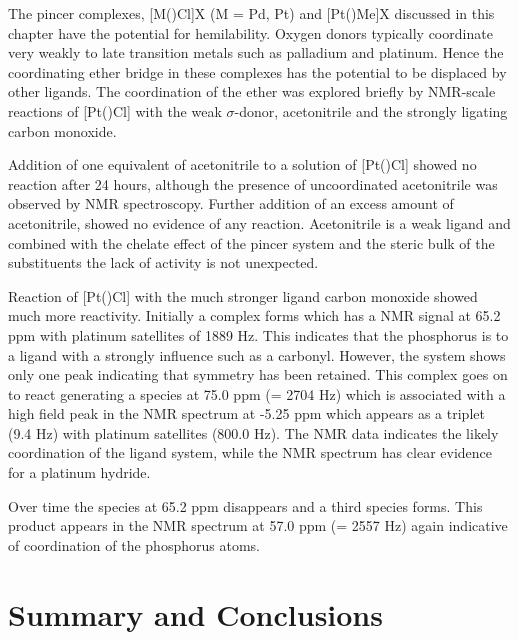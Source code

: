 The pincer complexes, [M(\tBuxantphos)Cl]X (M = Pd, Pt) and [Pt(\tBuxantphos)Me]X discussed in this chapter have the potential for hemilability.  Oxygen donors typically coordinate very weakly to late transition metals such as palladium and platinum.  Hence the coordinating ether bridge in these complexes has the potential to be displaced by other ligands.  The coordination of the ether was explored briefly by NMR-scale reactions of [Pt(\tButhixantphos)Cl] with the weak $\sigma$-donor, acetonitrile and the strongly ligating carbon monoxide.  

Addition of one equivalent of acetonitrile to a  solution of [Pt(\tButhixantphos)Cl] showed no reaction after 24 hours, although the presence of uncoordinated acetonitrile was observed by \proton{} NMR spectroscopy.  Further addition of an excess amount of acetonitrile, showed no evidence of any reaction.  Acetonitrile is a weak ligand and combined with the chelate effect of the pincer system and the steric bulk of the \tBu{} substituents the lack of activity is not unexpected.  

Reaction of [Pt(\tButhixantphos)Cl] with the much stronger ligand carbon monoxide showed much more reactivity.  Initially a complex forms which has a \phosphorus{} NMR signal at 65.2 ppm with platinum satellites of 1889 Hz.  This indicates that the phosphorus is \trans{} to a ligand with a strongly \trans{} influence such as a carbonyl.  However, the system shows only one \phosphorus{} peak indicating that symmetry has been retained.  This complex goes on to react generating a species at 75.0 ppm (\JPtP = 2704 Hz) which is associated with a high field peak in the \proton{} NMR spectrum at -5.25 ppm which appears as a triplet (9.4 Hz) with platinum satellites (800.0 Hz).  The \phosphorus{} NMR data indicates the likely \trans{} coordination of the \tBuxantphos{} ligand system, while the \proton{} NMR spectrum has clear evidence for a platinum hydride.  

Over time the species at 65.2 ppm disappears and a third species forms.  This product appears in the \phosphorus{} NMR spectrum at 57.0 ppm (\JPtP = 2557 Hz) again indicative of \trans{} coordination of the phosphorus atoms.  






\section{Summary and Conclusions}



